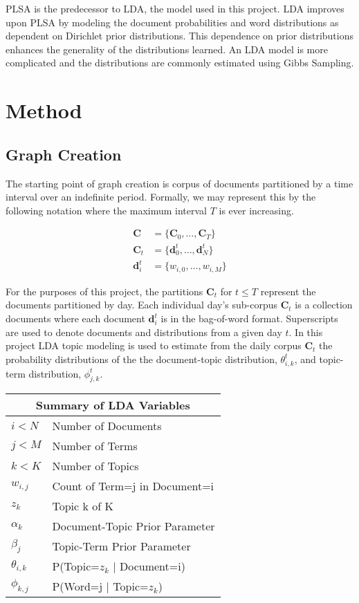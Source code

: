 \documentclass[10pt,twocolumn]{article}
\begin{document}
PLSA is the predecessor to LDA, the model used in this project.  LDA improves upon PLSA by modeling the document probabilities and word distributions as dependent on Dirichlet prior distributions.  This dependence on prior distributions enhances the generality of the distributions learned.  An LDA model is more complicated and the distributions are commonly estimated using Gibbs Sampling.

\section {Method}
\subsection {Graph Creation}
The starting point of graph creation is corpus of documents partitioned by a time interval over an indefinite period.   Formally, we may represent this by the following notation where the maximum interval $T$ is ever increasing.  

\begin{align*}
\mathbf{C} &= \{ \mathbf{C}_0, \dots, \mathbf{C}_T \} \\
\mathbf{C}_t &= \{\mathbf{d}_0^t, \dots, \mathbf{d}_N^t \} \\
\mathbf{d}_i^t &= \{ w_{i,0}, \dots, w_{i,M} \}
\end{align*}

For the purposes of this project, the partitions $\mathbf{C}_t$ for $t \le T$ represent the documents partitioned by day.  Each individual day's sub-corpus $\mathbf{C}_t$ is a collection documents where each document $\mathbf{d}_i^t$ is in the bag-of-word format.  Superscripts are used to denote documents and distributions from a given day $t$.  In this project LDA topic modeling is used to estimate from the daily corpus $\mathbf{C}_t$ the probability distributions of the the document-topic distribution, $\theta_{i,k}^t$, and topic-term distribution, $\phi_{j,k}^t$.

\begin{center}
\begin{tabular}{|l|l|}
  \hline
  \multicolumn{2}{|c|}{Summary of LDA Variables} \\
  \hline
  $i < N$ & Number of Documents \\
  $j < M$ & Number of Terms \\
  $k < K$ & Number of Topics \\
  $w_{i, j}$ & Count of Term=j in Document=i \\
  $z_k$ & Topic k of K \\
  \emph{$\alpha_k$} & Document-Topic Prior Parameter\\
  \emph{$\beta_j$} & Topic-Term Prior Parameter \\
  $\theta_{i,k}$ & P(Topic=$z_k$ $\vert$ Document=i) \\
  $\phi_{k,j}$ & P(Word=j $\vert$ Topic=$z_k$) \\
  \hline
\end{tabular}
\end{center} 
\end{document}
